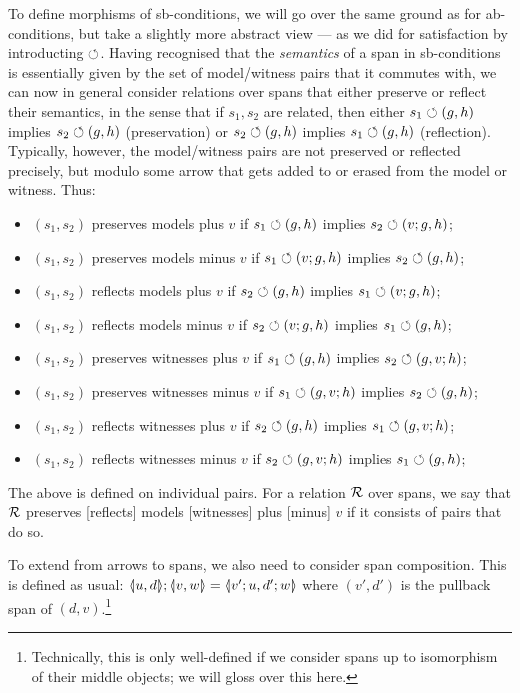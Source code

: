 To define morphisms of sb-conditions, we will go over the same ground as for ab-conditions, but take a slightly more abstract view --- as we did for satisfaction by introducting $\circlearrowleft$. Having recognised that the \emph{semantics} of a span in sb-conditions is essentially given by the set of model/witness pairs that it commutes with, we can now in general consider relations over spans that either preserve or reflect their semantics, in the sense that if $s_1,s_2$ are related, then either $s_1\circlearrowleft (g,h)$ implies $s_2\circlearrowleft (g,h)$ (preservation) or $s_2\circlearrowleft (g,h)$ implies $s_1\circlearrowleft (g,h)$ (reflection). Typically, however, the model/witness pairs are not preserved or reflected precisely, but modulo some arrow that gets added to or erased from the model or witness. Thus:
%
\begin{itemize}
\item $(s_1,s_2)$ preserves models plus $v$ if $s_1\circlearrowleft (g,h)$ implies $s_2\circlearrowleft (v;g,h)$;
\item $(s_1,s_2)$ preserves models minus $v$ if $s_1\circlearrowleft (v;g,h)$ implies $s_2\circlearrowleft (g,h)$;
\item $(s_1,s_2)$ reflects models plus $v$ if $s_2\circlearrowleft (g,h)$ implies $s_1\circlearrowleft (v;g,h)$;
\item $(s_1,s_2)$ reflects models minus $v$ if $s_2\circlearrowleft (v;g,h)$ implies $s_1\circlearrowleft (g,h)$;
\item $(s_1,s_2)$ preserves witnesses plus $v$ if $s_1\circlearrowleft (g,h)$ implies $s_2\circlearrowleft (g,v;h)$;
\item $(s_1,s_2)$ preserves witnesses minus $v$ if $s_1\circlearrowleft (g,v;h)$ implies $s_2\circlearrowleft (g,h)$;
\item $(s_1,s_2)$ reflects witnesses plus $v$ if $s_2\circlearrowleft (g,h)$ implies $s_1\circlearrowleft (g,v;h)$;
\item $(s_1,s_2)$ reflects witnesses minus $v$ if $s_2\circlearrowleft (g,v;h)$ implies $s_1\circlearrowleft (g,h)$;
\end{itemize}
%
The above is defined on individual pairs. For a relation $\mathcal{R}$ over spans, we say that $\mathcal{R}$ preserves [reflects] models [witnesses] plus [minus] $v$ if it consists of pairs that do so.

To extend  from arrows to spans, we also need to consider span composition. This is defined as usual: $\spanof u d;\spanof v w=\spanof{v';u}{d';w}$ where $(v',d')$ is the pullback span of $(d,v)$.\footnote{Technically, this is only well-defined if we consider spans up to isomorphism of their middle objects; we will gloss over this here.}

